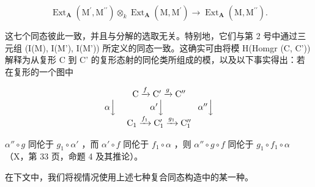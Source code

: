 \[
\operatorname{Ext} _ {\mathbf {A}} \left(\mathrm{M} ^ {\prime}, \mathrm{M} ^ {\prime \prime}\right) \otimes_ {k} \operatorname{Ext} _ {\mathbf {A}} \left(\mathrm{M}, \mathrm{M} ^ {\prime}\right)\rightarrow \operatorname{Ext} _ {\mathbf {A}} \left(\mathrm{M}, \mathrm{M} ^ {\prime \prime}\right).
\]

这七个同态彼此一致，并且与分解的选取无关。特别地，它们与第 2 号中通过三元组 (I(M), I(M'), I(M')) 所定义的同态一致。这确实可由将模 H(Homgr (C, C')) 解释为从复形 C 到 C' 的复形态射的同伦类所组成的模，以及以下事实得出：若在复形的一个图中

\[
\begin{array}{c} \mathrm{C} \xrightarrow {f} \mathrm{C} ^ {\prime} \xrightarrow {g} \mathrm{C} ^ {\prime \prime} \\ \alpha \Big \downarrow \qquad \qquad \alpha^ {\prime} \Big \downarrow \qquad \qquad \alpha^ {\prime \prime} \Big \downarrow \\ \mathrm{C} _ {1} \xrightarrow {f _ {1}} \mathrm{C} _ {1} ^ {\prime} \xrightarrow {g _ {1}} \mathrm{C} _ {1} ^ {\prime \prime} \end{array}
\]

\(\alpha'' \circ g\) 同伦于 \(g_1 \circ \alpha'\) ，而 \(\alpha' \circ f\) 同伦于 \(f_1 \circ \alpha\) ，则 \(\alpha'' \circ g \circ f\) 同伦于 \(g_1 \circ f_1 \circ \alpha\) （X，第 33 页，命题 4 及其推论）。

在下文中，我们将视情况使用上述七种复合同态构造中的某一种。

